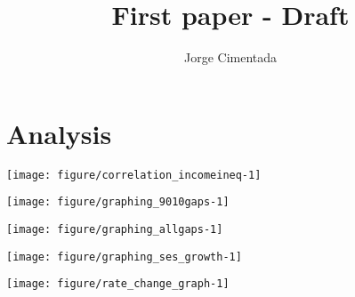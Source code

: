 \documentclass[11pt, a4paper]{article}\usepackage[]{graphicx}\usepackage[]{color}
\title{First paper - Draft}
\author{Jorge Cimentada}
\begin{document}
\setlength{\parindent}{2em}
\setlength{\parskip}{1em}

\maketitle





\tableofcontents

\section{Analysis}


















{\centering \texttt{[image: figure/correlation\_incomeineq-1]} 

}






{\centering \texttt{[image: figure/graphing\_9010gaps-1]} 

}






{\centering \texttt{[image: figure/graphing\_allgaps-1]} 

}






{\centering \texttt{[image: figure/graphing\_ses\_growth-1]} 

}








{\centering \texttt{[image: figure/rate\_change\_graph-1]} 

}
\end{document}
